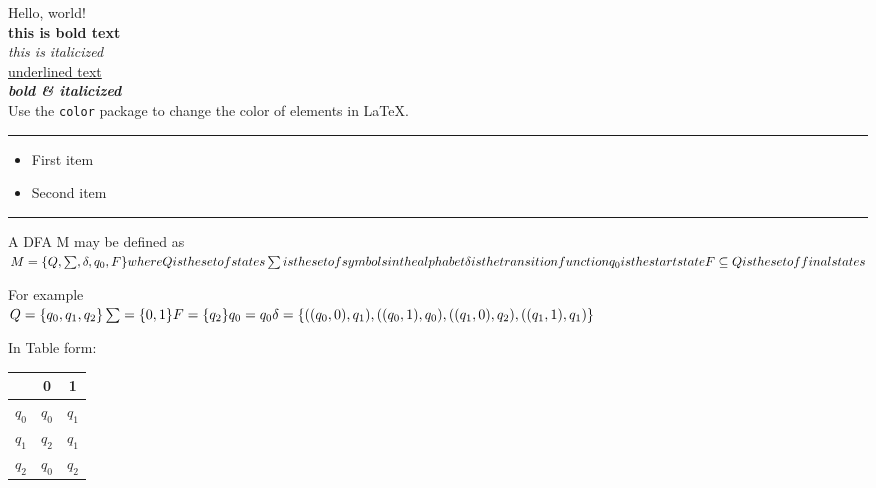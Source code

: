 \documentclass{article}
\begin{document}
Hello, world! \\

\textbf{this is bold text} \\

\textit{this is italicized} \\
\underline{underlined text} \\
\textbf{\textit{bold \& italicized}} \\

Use the \texttt{color} package 
to change the color of elements in \LaTeX.
 
\noindent
{\color{blue} \rule{\linewidth}{0.1mm} }

\begin{itemize}
\color{blue}
\item First item
\item Second item
\end{itemize}
 
\noindent
{\color{red} \rule{\linewidth}{0.2mm} }

A DFA M may be defined as \\

$
M = \{Q, \sum, \delta, q_0, F \} \\
where Q is the set of states \\
\sum is the set of symbols in the alphabet \\
\delta is the transition function \\
q_0 is the start state \\
F \subseteq Q is the set of final states \\
$

For example \\

$
Q = \{q_0, q_1, q_2 \} \\
\sum = \{0, 1 \} \\
F = \{q_2 \} \\
q_0 = q_0 \\
\delta = \{ ((q_0, 0), q_1), ((q_0, 1), q_0), ((q_1, 0), q_2), ((q_1, 1), q_1) \} \\
$

In Table form: \\

\begin{center}
 \begin{tabular}{||c c c||} 
 \hline
 \space 	& 0 		& 1 		\\ [0.5ex] 
 \hline
 $q_0$ 		& $q_0$ 	& $q_1$		\\
 \hline
 $q_1$ 		& $q_2$ 	& $q_1$		\\
 \hline
 $q_2$ 		& $q_0$ 	& $q_2$		\\
 \hline
\end{tabular}
\end{center}
\end{document}
